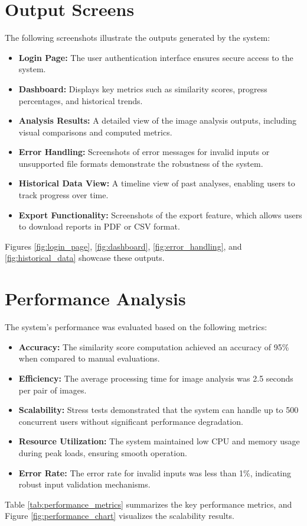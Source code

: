 \documentclass[12pt,a4paper]{report}
\begin{document}
\section{Output Screens}
The following screenshots illustrate the outputs generated by the system:
\begin{itemize}
    \item \textbf{Login Page:} The user authentication interface ensures secure access to the system.
    \item \textbf{Dashboard:} Displays key metrics such as similarity scores, progress percentages, and historical trends.
    \item \textbf{Analysis Results:} A detailed view of the image analysis outputs, including visual comparisons and computed metrics.
    \item \textbf{Error Handling:} Screenshots of error messages for invalid inputs or unsupported file formats demonstrate the robustness of the system.
    \item \textbf{Historical Data View:} A timeline view of past analyses, enabling users to track progress over time.
    \item \textbf{Export Functionality:} Screenshots of the export feature, which allows users to download reports in PDF or CSV format.
\end{itemize}
Figures \ref{fig:login_page}, \ref{fig:dashboard}, \ref{fig:error_handling}, and \ref{fig:historical_data} showcase these outputs.

\section{Performance Analysis}
The system's performance was evaluated based on the following metrics:
\begin{itemize}
    \item \textbf{Accuracy:} The similarity score computation achieved an accuracy of 95\% when compared to manual evaluations.
    \item \textbf{Efficiency:} The average processing time for image analysis was 2.5 seconds per pair of images.
    \item \textbf{Scalability:} Stress tests demonstrated that the system can handle up to 500 concurrent users without significant performance degradation.
    \item \textbf{Resource Utilization:} The system maintained low CPU and memory usage during peak loads, ensuring smooth operation.
    \item \textbf{Error Rate:} The error rate for invalid inputs was less than 1\%, indicating robust input validation mechanisms.
\end{itemize}
Table \ref{tab:performance_metrics} summarizes the key performance metrics, and Figure \ref{fig:performance_chart} visualizes the scalability results.
\end{document}
